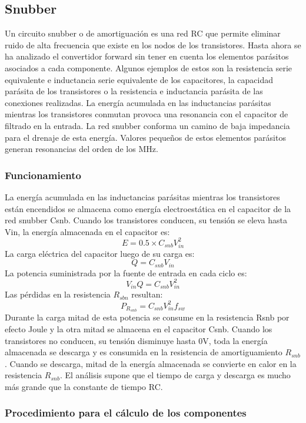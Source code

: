 \subsection{Snubber}

Un circuito snubber o de amortiguación es una red RC que permite eliminar ruido de alta frecuencia que existe en los nodos de los transistores.
Hasta ahora se ha analizado el convertidor forward sin tener en cuenta los elementos parásitos asociados a cada componente. 
Algunos ejemplos de estos son la resistencia serie equivalente e inductancia serie equivalente de los capacitores, 
la capacidad parásita de los transistores o la resistencia e inductancia parásita de las conexiones realizadas. 
La energía acumulada en las inductancias parásitas mientras los transistores conmutan provoca una resonancia con el capacitor de filtrado en la entrada. 
La red snubber conforma un camino de baja impedancia para el drenaje de esta energía. 
Valores pequeños de estos elementos parásitos generan resonancias del orden de los MHz. 

\subsubsection{Funcionamiento}

La energía acumulada en las inductancias parásitas mientras los transistores están encendidos se almacena como energía electroestática en el capacitor de la red snubber Csnb. 
Cuando los transistores conducen, su tensión se eleva hasta Vin, la energía almacenada en el capacitor es: 
$$ E=0.5\times C_{snb}V_{in}^{2} $$
La carga eléctrica del capacitor luego de su carga es:
$$ Q=C_{snb}V_{in} $$
La potencia suministrada por la fuente de entrada en cada ciclo es:
$$ V_{in}Q=C_{snb}V_{in}^{2} $$
Las pérdidas en la resistencia $R_{sbn}$ resultan:
$$ P_{R_{snb}}=C_{snb}V_{in}^{2}f_{sw} $$
Durante la carga mitad de esta potencia se consume en la resistencia Rsnb por efecto Joule y la otra mitad se almacena en el capacitor Csnb. 
Cuando los transistores no conducen, su tensión disminuye hasta 0V, toda la energía almacenada se descarga y es consumida en la resistencia de amortiguamiento $R_{snb}$.
Cuando se descarga, mitad de la energía almacenada se convierte en calor en la resistencia $R_{snb}$. 
El análisis supone que el tiempo de carga y descarga es mucho más grande que la constante de tiempo RC. 

\subsubsection{Procedimiento para el cálculo de los componentes}

